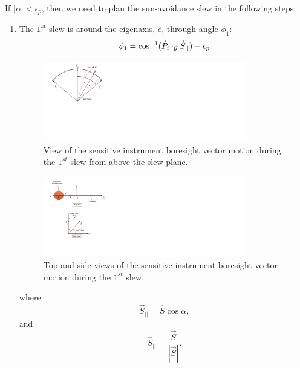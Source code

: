 \documentclass[letterpaper, paper,12pt]{AAS}		%
\begin{document}
	If $|\alpha|<\epsilon_p$, then we need to plan the sun-avoidance slew in the following steps: 
	\begin{enumerate}
		\item The $1^{st}$ slew is around the eigenaxis, $\hat{e}$, through angle $\phi_1$:
		\begin{equation}\label{phi1_1}
		\phi_1 = \cos^{-1}(\hat{P}_i\cdot_\mathcal{G}\hat{S}_{||})-\epsilon_p\\
		\end{equation}
		\begin{figure}[H]
			\begin{center}
				\includegraphics[width=3.5in]{./Figures/SVAS_1r_modified}
				\caption{View of the sensitive instrument boresight vector motion during the $1^{st}$ slew from above the slew plane.}
			\end{center}
		\end{figure}
		\begin{figure}[H]
			\begin{center}
				\includegraphics[width=3.5in]{./Figures/SVAS_1rb_modified}
				\caption{Top and side views of the sensitive instrument boresight vector motion during the $1^{st}$ slew.}
			\end{center}
		\end{figure}
		where 
		\begin{equation}\label{Sbar}
		\vec{S}_{||}=\hat{S}\cos\alpha, 
		\end{equation}
		and
		\begin{equation}\label{Shat}
		\hat{S}_{||}=\frac{\vec{S}}{|\vec{S}|}.
		\end{equation}
	

\end{enumerate}
\end{document}
